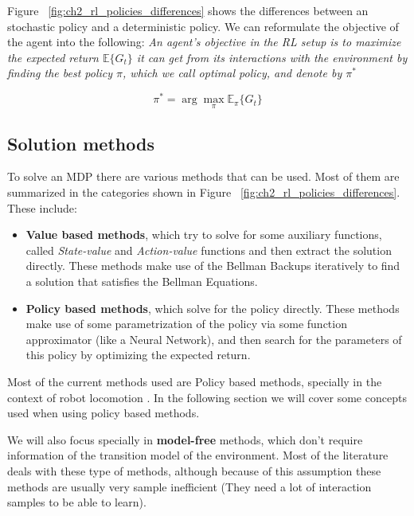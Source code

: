 \figRlPolicies

Figure ~\ref{fig:ch2_rl_policies_differences} shows the differences between an stochastic policy and a deterministic
policy. We can reformulate the objective of the agent into the following: \textit{An agent's objective
in the RL setup is to maximize the expected return $\mathbb{E} \lbrace G_{t} \rbrace$ it
can get from its interactions with the environment by finding the best policy $\pi$, which
we call optimal policy, and denote by $\pi^{*}$}

\begin{equation} \label{eq:rl_objective}
    \pi^{*} = \arg \max_{\pi} \mathbb{E}_{\pi} \lbrace G_{t} \rbrace
\end{equation}

\subsection{Solution methods}

\figRlMethodsLandspace

To solve an MDP there are various methods that can be used. Most of them are
summarized in the categories shown in Figure ~\ref{fig:ch2_rl_policies_differences}. These include:

\begin{itemize}
    \item \textbf{Value based methods}, which try to solve for some auxiliary
          functions, called \textit{State-value} and \textit{Action-value} functions
          and then extract the solution directly. These methods make use of the Bellman
          Backups iteratively to find a solution that satisfies the Bellman Equations.
    \item \textbf{Policy based methods}, which solve for the policy directly. These methods
          make use of some parametrization of the policy via some function approximator
          (like a Neural Network), and then search for the parameters of this policy
          by optimizing the expected return.
\end{itemize}

Most of the current methods used are Policy based methods, specially in the context
of robot locomotion . In the following section we will cover some concepts used when
using policy based methods. 

We will also focus specially in \textbf{model-free} methods,
which don't require information of the transition model of the environment. Most of the
literature deals with these type of methods, although because of this assumption these
methods are usually very sample inefficient (They need a lot of interaction samples to be
able to learn).


